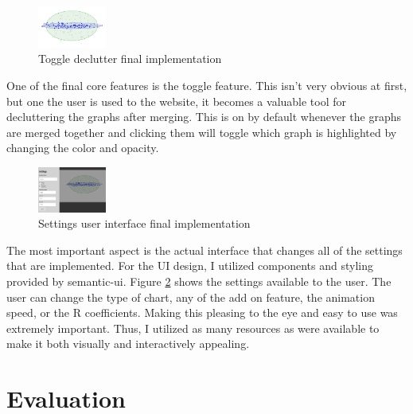 \documentclass{proc}
\begin{document}
		\begin{figure}[t]
			\centering
			\includegraphics[width=0.2\textwidth]{toggle}
			\caption{Toggle declutter final implementation}
			\label{fig:toggle}
		\end{figure}
		
		One of the final core features is the toggle feature. This isn't very obvious at first, but one the user is used to the website, it becomes a valuable tool for decluttering the graphs after merging. This is on by default whenever the graphs are merged together and clicking them will toggle which graph is highlighted by changing the color and opacity. 
		
		\begin{figure}[t]
			\centering
			\includegraphics[width=0.2\textwidth]{ui}
			\caption{Settings user interface final implementation}
			\label{fig:ui}
		\end{figure}
		
		The most important aspect is the actual interface that changes all of the settings that are implemented. For the UI design, I utilized components and styling provided by semantic-ui. Figure \ref{fig:ui} shows the settings available to the user. The user can change the type of chart, any of the add on feature, the animation speed, or the R coefficients. Making this pleasing to the eye and easy to use was extremely important. Thus, I utilized as many resources as were available to make it both visually and interactively appealing. 
		
	\section{Evaluation}
		
\end{document}
